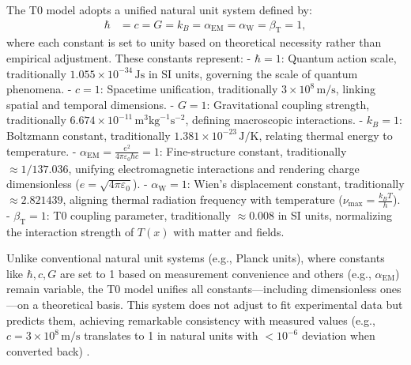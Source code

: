 \documentclass[twocolumn,aps,prl]{revtex4-2}
\newcommand{\Tfield}{T(x)}
\newcommand{\alphaEM}{\alpha_{\text{EM}}}
\newcommand{\alphaW}{\alpha_{\text{W}}}
\newcommand{\betaT}{\beta_{\text{T}}}
\begin{document}
	The T0 model adopts a unified natural unit system defined by:
	\begin{align}
		\hbar &= c = G = k_B = \alphaEM = \alphaW = \betaT = 1,
		\label{eq:unit_system}
	\end{align}
	where each constant is set to unity based on theoretical necessity rather than empirical adjustment. These constants represent:
	- \(\hbar = 1\): Quantum action scale, traditionally \(1.055 \times 10^{-34} \, \text{Js}\) in SI units, governing the scale of quantum phenomena.
	- \(c = 1\): Spacetime unification, traditionally \(3 \times 10^8 \, \text{m/s}\), linking spatial and temporal dimensions.
	- \(G = 1\): Gravitational coupling strength, traditionally \(6.674 \times 10^{-11} \, \text{m}^3\text{kg}^{-1}\text{s}^{-2}\), defining macroscopic interactions.
	- \(k_B = 1\): Boltzmann constant, traditionally \(1.381 \times 10^{-23} \, \text{J/K}\), relating thermal energy to temperature.
	- \(\alphaEM = \frac{e^2}{4\pi\varepsilon_0\hbar c} = 1\): Fine-structure constant, traditionally \(\approx 1/137.036\), unifying electromagnetic interactions and rendering charge dimensionless (\(e = \sqrt{4\pi\varepsilon_0}\)).
	- \(\alphaW = 1\): Wien’s displacement constant, traditionally \(\approx 2.821439\), aligning thermal radiation frequency with temperature (\(\nu_{\text{max}} = \frac{k_B T}{h}\)).
	- \(\betaT = 1\): T0 coupling parameter, traditionally \(\approx 0.008\) in SI units, normalizing the interaction strength of \(\Tfield\) with matter and fields.
	
	Unlike conventional natural unit systems (e.g., Planck units), where constants like \(\hbar, c, G\) are set to 1 based on measurement convenience and others (e.g., \(\alphaEM\)) remain variable, the T0 model unifies all constants—including dimensionless ones—on a theoretical basis. This system does not adjust to fit experimental data but predicts them, achieving remarkable consistency with measured values (e.g., \(c = 3 \times 10^8 \, \text{m/s}\) translates to 1 in natural units with \(< 10^{-6}\) deviation when converted back) \cite{pascher_alphabeta_2025}.
	
\end{document}
